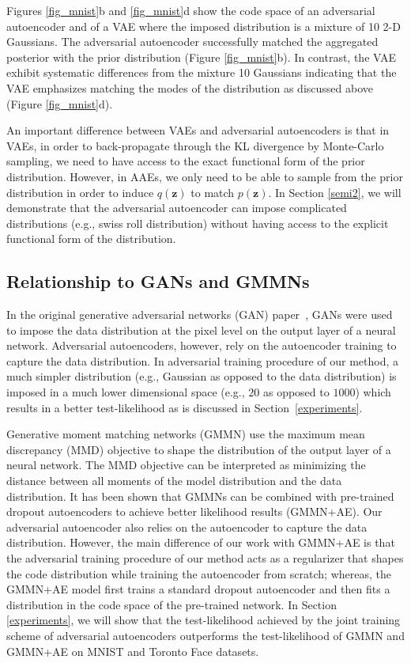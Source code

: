 \documentclass{article}
\begin{document}
Figures \ref{fig_mnist}b and \ref{fig_mnist}d show the code space of an adversarial autoencoder and of a VAE where the imposed distribution is a mixture of 10 2-D Gaussians.
The adversarial autoencoder successfully matched the aggregated posterior with the prior distribution (Figure \ref{fig_mnist}b).
In contrast, the VAE exhibit systematic differences from the mixture 10 Gaussians indicating that the VAE emphasizes matching the modes of the distribution as discussed above (Figure \ref{fig_mnist}d).

An important difference between VAEs and adversarial autoencoders is that in VAEs, in order to back-propagate through the KL divergence by Monte-Carlo sampling, we need to have access to the exact functional form of the prior distribution.
However, in AAEs, we only need to be able to sample from the prior distribution in order to induce $q(\mathbf{z})$ to match $p(\mathbf{z})$. In Section \ref{semi2}, we will demonstrate that the adversarial autoencoder can impose complicated distributions (e.g., swiss roll distribution) without having access to the explicit functional form of the distribution.


\subsection{Relationship to GANs and GMMNs}\label{gmmn}

In the original generative adversarial networks (GAN) paper~\citep{gan}, GANs were used to impose the data distribution at the pixel level on the output layer of a neural network. Adversarial autoencoders, however, rely on the autoencoder training to capture the data distribution. In adversarial training procedure of our method, a much simpler distribution (e.g., Gaussian as opposed to the data distribution) is imposed in a much lower dimensional space (e.g., $20$ as opposed to $1000$) which results in a better test-likelihood as is discussed in Section~\ref{experiments}.

Generative moment matching networks (GMMN) \citep{gmmn} use the maximum mean discrepancy (MMD) objective to shape the distribution of the output layer of a neural network. The MMD objective can be interpreted as minimizing the distance between all moments of the model distribution and the data distribution. It has been shown that GMMNs can be combined with pre-trained dropout autoencoders to achieve better likelihood results (GMMN+AE). Our adversarial autoencoder also relies on the autoencoder to capture the data distribution. However, the main difference of our work with GMMN+AE is that the adversarial training procedure of our method acts as a regularizer that shapes the code distribution while training the autoencoder from scratch; whereas, the GMMN+AE model first trains a standard dropout autoencoder and then fits a distribution in the code space of the pre-trained network. In Section \ref{experiments}, we will show that the test-likelihood achieved by the joint training scheme of adversarial autoencoders outperforms the test-likelihood of GMMN and GMMN+AE on MNIST and Toronto Face datasets.
\end{document}
